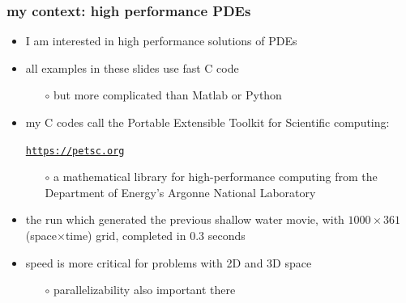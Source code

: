 \documentclass[10pt,dvipsnames,usepdftitle=false,
hyperref={pdftitle = {Finite volume methods},
    pdfauthor = {Ed Bueler}}]{beamer}
\begin{document}
\begin{frame}[fragile]

\frametitle{my context: high performance PDEs}

\begin{itemize}
\item I am interested in high performance solutions of PDEs
\item all examples in these slides use fast C code
    \begin{itemize}
    \item[$\circ$] but more complicated than Matlab or Python
    \end{itemize}
\item my C codes call the Portable Extensible Toolkit for Scientific computing:

    \begin{center}
    \href{https://petsc.org/release/}{\texttt{https://petsc.org}}
    \end{center}

    \begin{itemize}
    \item[$\circ$] a mathematical library for high-performance computing from the Department of Energy's Argonne National Laboratory
    \end{itemize}
\item the run which generated the previous shallow water movie, with $1000\times 361$ (space$\times$time) grid, completed in 0.3 seconds

\item speed is more critical for problems with 2D and 3D space
    \begin{itemize}
    \item[$\circ$] parallelizability also important there
    \end{itemize}
\end{itemize}
\end{frame}
\end{document}
